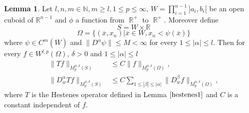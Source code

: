 \documentclass[12pt]{article}
\theoremstyle{definition}
\newtheorem{lemma}{Lemma}
\DeclareMathOperator\rr{\mathbb{R}}
\begin{document}
\begin{lemma}\label{hmorrey1}
Let $l,n,m \in \mathbb{N},m\ge l, 1\le p \le \infty$, $W = \prod\limits_{i=1}^{n-1}]a_i,b_i[$ be an open cuboid of $\mathbb{R}^{n-1}$ and $\phi$ a function from $\rr^+$ to $\rr^+$. Moreover define
\[ S=W \times \mathbb{R} \]
\[\Omega =\{ (\overline x,x_n) | \overline x\in W, x_n<\psi(\overline x)  \} \]
where $\psi \in C^m(\overline W)$ and $\| D^{\alpha}\psi \|\le M <\infty $ for every $1\le|\alpha|\le l$. Then for every $f \in W^{l,p}(\Omega)$, $\delta>0$ and  $1\le |\alpha|\le l$
\begin{align}
\| Tf\|_{M_p^{\phi,\delta}(S)} &\le    C\| f\|_{M_p^{\phi,\delta}(\Omega)} ,\\
\| D^\alpha_w Tf\|_{M_p^{\phi,\delta}(S)} &\le   C\sum_{1\le |\beta|\le|\alpha| }\| D^\beta_wf\|_{M_p^{\phi,\delta}(\Omega)},
\end{align}
where $T$ is the Hestenes operator defined in Lemma $\ref{hestenes1}$ and $C$ is a constant independent of $f$.
\end{lemma}
\end{document}
